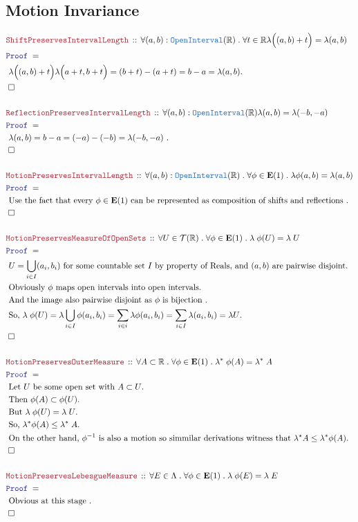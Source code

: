 \documentclass[12pt]{scrartcl}
\newcommand{\TYPE}[1]{\textcolor{NavyBlue}{\mathtt{#1}}}
\newcommand{\LOGIC}[1]{\textcolor{Blue}{\mathtt{#1}}}
\newcommand{\THM}[1]{\textcolor{Maroon}{\mathtt{#1}}}
\renewcommand{\.}{\; . \;}
\newcommand{\Theorem}[2]{& \THM{#1} \, :: \, #2 \\ & \Proof = \\ }
\newcommand{\Page}[1]{ \begin{align*} #1 \end{align*}   }
\newcommand{\Reals}{\mathbb{R} }
\newcommand{\QED}{\; \square}
\newcommand{\EndProof}{& \QED \\}
\newcommand{\Proof}{\LOGIC{Proof} \; }
\newcommand{\Explain}[1]{& \text{#1.} \\}
\newcommand{\T}{\mathcal{T}}
\newcommand{\OI}{\TYPE{OpenInterval}}
\begin{document}
\subsection{Motion Invariance}
\Page{
	\Theorem{ShiftPreservesIntervalLength}
	{
		\forall (a,b) : \OI(\Reals) \.
		\forall t \in \Reals 
		\lambda\Big( (a,b) + t \Big) = \lambda (a,b)
	}
	\Explain{
		$
			\lambda\Big( (a,b) + t \Big) 
			\lambda\Big( a + t, b + t \Big)  = 
			(b + t) - (a + t) =  
			b - a =
			\lambda(a,b)
		$}
	\EndProof
	\\
	\Theorem{ReflectionPreservesIntervalLength}
	{
		\forall (a,b) : \OI(\Reals) 
		\lambda(a,b) = \lambda(-b,-a)
	}
	\Explain{
		$\lambda(a,b) = b - a =  (-a) -(-b) = \lambda(-b,-a)$
	}
	\EndProof
	\\
	\Theorem{MotionPreservesIntervalLength}
	{
		\forall (a,b) : \OI(\Reals) \.
		\forall \phi \in \mathbf{E}(1) \.
		\lambda \phi(a,b) = \lambda(a,b)
	}
	\Explain{
		Use the fact that every $\phi \in \mathbf{E}(1)$ can be represented 
		as composition of shifts and reflections
	}
	\EndProof
	\\
	\Theorem{MotionPreservesMeasureOfOpenSets}
	{
		\forall U \in \T(\Reals) \. 
		\forall \phi \in \mathbf{E}(1) \.		
		\lambda \; \phi(U) =  \lambda \;U 
	}
	\Explain{
		$U = \bigcup_{i \in I} (a_i,b_i)$ for some 
		countable  set $I$		
		by property of Reals, and $(a,b)$ are pairwise disjoint}
	\Explain{
		Obviously $\phi$ maps open intervals into open intervals}
	\Explain{
		And the image also pairwise disjoint as $\phi$ is bijection
	}
	\Explain{
		So,
		$
				\lambda \; \phi(U) = 
				\lambda \bigcup_{i \in I} \phi(a_i,b_i) =
				\sum_{i \in i} \lambda \phi (a_i, b_i) =
				\sum_{i \in I} \lambda (a_i, b_i) = 
				\lambda U
 		$}
 	\EndProof
 	\\
 	\Theorem{MotionPreservesOuterMeasure}
 	{
 		\forall A \subset \Reals \.
 		\forall \phi \in \mathbf{E}(1) \.		
		\lambda^* \; \phi(A) =  \lambda^* \;A 
 	}
 	\Explain{ Let $U$ be some open set with $A \subset U$}
 	\Explain{ Then $\phi(A) \subset \phi(U)$}
 	\Explain{ But $\lambda \; \phi(U) =  \lambda \;U$}
 	\Explain{ So, $\lambda^* \phi(A) \le \lambda^* \; A$} 
 	\Explain{ On the other hand, $\phi^{-1}$ is also a motion so simmilar derivations witness 
 		that $\lambda^\star A \le \lambda^* \phi(A)$}	
 	\EndProof
 	\\
 	\Theorem{MotionPreservesLebesgueMeasure}
 	{
 		\forall E \in \Lambda \.
 		\forall \phi \in \mathbf{E}(1) \.		
		\lambda \; \phi(E) =  \lambda \; E 
 	}
 	\Explain{
 		Obvious at this stage
 	}
 	\EndProof
}\Page{
}
\end{document}
